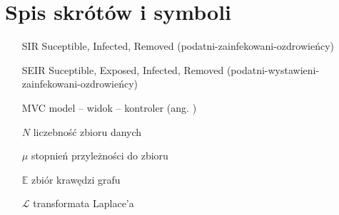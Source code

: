 \chapter{Spis skrótów i symboli}

\begin{itemize}
\item[SIR] Suceptible, Infected, Removed (podatni-zainfekowani-ozdrowieńcy)
\item[SEIR] Suceptible, Exposed, Infected, Removed (podatni-wystawieni-zainfekowani-ozdrowieńcy)
\item[MVC] model -- widok -- kontroler (ang. ) 
\item[$N$] liczebność zbioru danych
\item[$\mu$] stopnień przyleżności do zbioru
\item[$\mathbb{E}$] zbiór krawędzi grafu
\item[$\mathcal{L}$] transformata Laplace'a 
\end{itemize}
